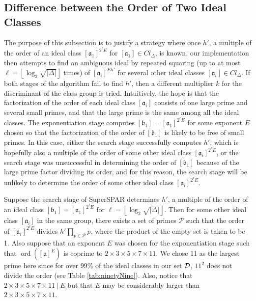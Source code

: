 \documentclass{ucalgthes1}
\theoremstyle{definition}
\DeclareMathOperator{\ord}{ord}
\newcommand{\floor}[1]{\left\lfloor #1 \right\rfloor}
\newcommand{\set}{\mathcal}
\newcommand{\ideal}{\mathfrak}
\newcommand{\idealclass}[1]{\left[ \ideal #1 \right]}
\newcommand{\aclass}{\idealclass a}
\newcommand{\hdelta}{\sqrt{|\Delta|}}
\begin{document}
\subsection{Difference between the Order of Two Ideal Classes}
\label{subsec:ssparDiffBtwOrder}

The purpose of this subsection is to justify a strategy where once $h'$, a multiple of the order of an ideal class $\idealclass{a_1}^{2^\ell E}$ for $\idealclass{a_1} \in Cl_\Delta$, is known, our implementation then attempts to find an ambiguous ideal by repeated squaring (up to at most $\ell = \floor{\log_2 \hdelta}$ times) of $\idealclass{a_i}^{Eh'}$ for several other ideal classes $\idealclass{a_i} \in Cl_\Delta$.  If both stages of the algorithm fail to find $h'$, then a different multiplier $k$ for the discriminant of the class group is tried.  Intuitively, the hope is that the factorization of the order of each ideal class $\idealclass{a_i}$ consists of one large prime and several small primes, and that the large prime is the same among all the ideal classes.  The exponentiation stage computes $\idealclass{b_1} = \idealclass{a_1}^{2^\ell E}$ for some exponent $E$ chosen so that the factorization of the order of $\idealclass{b_1}$ is likely to be free of small primes.  In this case, either the search stage successfully computes $h'$, which is hopefully also a multiple of the order of some other ideal class $\idealclass{a_i}^{2^\ell E}$, or the search stage was unsuccessful in determining the order of $\idealclass{b_1}$ because of the large prime factor dividing its order, and for this reason, the search stage will be unlikely to determine the order of some other ideal class $\idealclass{a_i}^{2^\ell E}$.

Suppose the search stage of SuperSPAR determines $h'$, a multiple of the order of an ideal class $\idealclass{b_1} = \idealclass{a_1}^{2^\ell E}$ for $\ell = \floor{\log_2 \hdelta}$.  Then for some other ideal class $\idealclass{a_i}$ in the same group, there exists a set of primes $\set P$ such that the order of $\idealclass{a_i}^{2^\ell E}$ divides $h' \prod_{p \in \set P} p$, where the product of the empty set is taken to be 1.  Also suppose that an exponent $E$ was chosen for the exponentiation stage such that $\ord(\aclass^E)$ is coprime to $2 \times 3 \times 5 \times 7 \times 11$.  We chose 11 as the largest prime here since for over 99\% of the ideal classes in our set $\idealDataSet$, $11^2$ does not divide the order (see Table \ref{tab:ninetyNine}).  Also, notice that $2 \times 3 \times 5 \times 7 \times 11 ~|~ E$ but that $E$ may be considerably larger than $2 \times 3 \times 5 \times 7 \times 11$.
\end{document}
